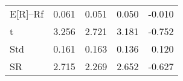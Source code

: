\begin{tabular}{lrrrr}
\toprule
\midrule
E[R]--Rf & 0.061 & 0.051 & 0.050 & -0.010 \\
t & 3.256 & 2.721 & 3.181 & -0.752 \\
Std & 0.161 & 0.163 & 0.136 & 0.120 \\
SR & 2.715 & 2.269 & 2.652 & -0.627 \\
\bottomrule
\end{tabular}
